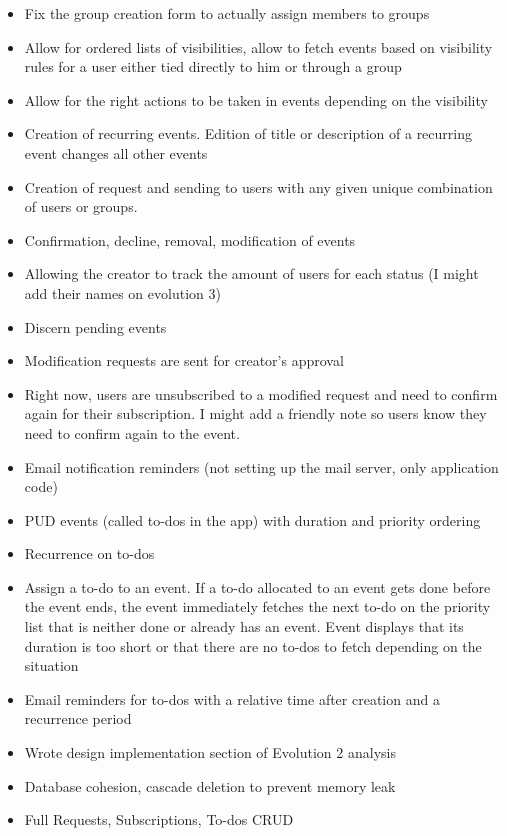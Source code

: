 \documentclass[11pt]{article}
\begin{document}
\begin{itemize}

\item Fix the group creation form to actually assign members to groups
\item Allow for ordered lists of visibilities, allow to fetch events based on visibility rules for a user either tied directly to him or through a group
\item Allow for the right actions to be taken in events depending on the visibility
\item Creation of recurring events. Edition of title or description of a recurring event changes all other events
\item Creation of request and sending to users with any given unique combination of users or groups.
\item Confirmation, decline, removal, modification of events
\item Allowing the creator to track the amount of users for each status (I might add their names on evolution 3)
\item Discern pending events
\item Modification requests are sent for creator’s approval
\item Right now, users are unsubscribed to a modified request and need to confirm again for their subscription. I might add a friendly note so users know they need to confirm again to the event.
\item Email notification reminders (not setting up the mail server, only application code)
\item PUD events (called to-dos in the app) with duration and priority ordering
\item Recurrence on to-dos
\item Assign a to-do to an event. If a to-do allocated to an event gets done before the event ends, the event immediately fetches the next to-do on the priority list that is neither done or already has an event. Event displays that its duration is too short or that there are no to-dos to fetch depending on the situation
\item Email reminders for to-dos with a relative time after creation and a recurrence period
\item Wrote design implementation section of Evolution 2 analysis
\item Database cohesion, cascade deletion to prevent memory leak
\item Full Requests, Subscriptions, To-dos CRUD

\end{itemize}
\end{document}
